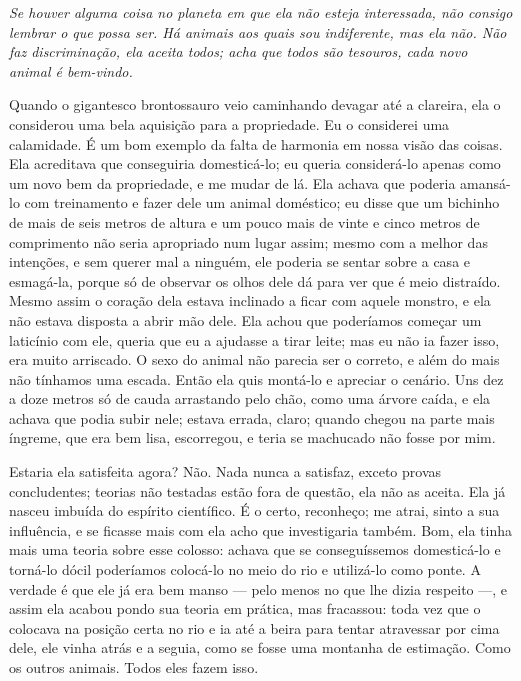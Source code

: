  {\itshape Se houver alguma coisa no planeta em que ela não
esteja interessada, não consigo lembrar o que possa ser. Há animais aos quais sou
indiferente, mas ela não. Não faz discriminação, ela aceita todos; acha que
todos são tesouros, cada novo animal é bem-vindo.


Quando o gigantesco brontossauro veio caminhando devagar até a
clareira, ela o considerou uma bela aquisição para a propriedade. Eu o considerei
uma calamidade. É um bom exemplo da falta de harmonia em nossa visão
das coisas. Ela acreditava que conseguiria domesticá-lo; eu queria considerá-lo
apenas como um novo bem da propriedade, e me mudar de lá. Ela achava
que poderia amansá-lo com treinamento e fazer dele um animal
doméstico; eu disse que um bichinho de mais de seis metros de altura e um pouco
mais de vinte e cinco metros de comprimento não seria apropriado num
lugar assim; mesmo com a melhor das intenções, e sem querer mal a ninguém,
ele poderia se sentar sobre a casa e esmagá-la, porque só de observar os olhos
dele dá para ver que é meio distraído. Mesmo assim o coração dela estava
inclinado a ficar com aquele monstro, e ela não estava disposta a abrir mão dele. Ela achou
que poderíamos começar um laticínio com ele, queria que eu a ajudasse a tirar
leite; mas eu não ia fazer isso, era muito arriscado. O sexo do animal não parecia ser o
correto, e além do mais não tínhamos uma escada. Então ela quis montá-lo e
apreciar o cenário. Uns dez a doze metros só de cauda arrastando pelo chão,
como uma árvore caída, e ela achava que podia subir nele; estava errada, claro;
quando chegou na parte mais íngreme, que era bem lisa, escorregou, e teria
se machucado não fosse por mim.

Estaria ela satisfeita agora? Não. Nada nunca a satisfaz, exceto provas concludentes;
teorias não testadas estão fora de questão, ela não as aceita. Ela já nasceu imbuída do espírito científico. 
É o certo, reconheço; me atrai, sinto a sua influência, e se ficasse mais com ela
acho que investigaria também. Bom, ela tinha mais uma teoria sobre esse
colosso: achava que se conseguíssemos domesticá-lo e torná-lo dócil
poderíamos colocá-lo no meio do rio e utilizá-lo como ponte. A verdade é que
ele já era bem manso --- pelo menos no que lhe dizia respeito ---, e assim
ela acabou pondo sua teoria em prática, mas fracassou: toda vez que o colocava na posição certa no
rio e ia até a beira para tentar atravessar por cima dele, ele vinha atrás e a
seguia, como se fosse uma montanha de estimação. Como os outros animais. Todos
eles fazem isso.
}

